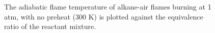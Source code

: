 \begin{figure}

\centering



\caption[- flames - II]{The adiabatic flame temperature of alkane-air flames burning at 1 atm, with no preheat (300 K) is plotted against the equivalence ratio of the reactant mixture.}

\label{fig:c1c3-t}

\end{figure}
